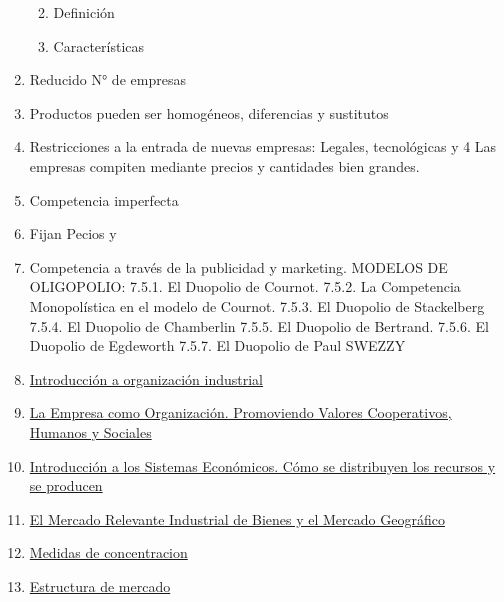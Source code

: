 \documentclass[
  a4paper,
]{article}
\providecommand{\tightlist}{%
  \setlength{\itemsep}{0pt}\setlength{\parskip}{0pt}}\usepackage{longtable,booktabs,array}
\begin{document}
\begin{enumerate}
  \begin{enumerate}
  \def\labelenumii{\Alph{enumii})}
  \tightlist
  \item
    Definición
  \item
    Características
  \end{enumerate}
\item
  Reducido N° de empresas
\item
  Productos pueden ser homogéneos, diferencias y sustitutos
\item
  Restricciones a la entrada de nuevas empresas: Legales, tecnológicas y
  4 Las empresas compiten mediante precios y cantidades bien grandes.
\item
  Competencia imperfecta
\item
  Fijan Pecios y
\item
  Competencia a través de la publicidad y marketing. MODELOS DE
  OLIGOPOLIO: 7.5.1. El Duopolio de Cournot. 7.5.2. La Competencia
  Monopolística en el modelo de Cournot. 7.5.3. El Duopolio de
  Stackelberg 7.5.4. El Duopolio de Chamberlin 7.5.5. El Duopolio de
  Bertrand. 7.5.6. El Duopolio de Egdeworth 7.5.7. El Duopolio de Paul
  SWEZZY
\item
  \href{../2023-06-12-introducion-organizacion-industrial-oi-cap1/index.qmd}{Introducción
  a organización industrial}
\item
  \href{../2023-06-13-empresa-como-organizacion-oi-cap1/index.qmd}{La
  Empresa como Organización. Promoviendo Valores Cooperativos, Humanos y
  Sociales}
\item
  \href{../2023-06-13-sistemas-economicos-oi.cap1/index.qmd}{Introducción
  a los Sistemas Económicos. Cómo se distribuyen los recursos y se
  producen}
\item
  \href{../2023-06-15-mercado-relevante-oi-cap2/index.qmd}{El Mercado
  Relevante Industrial de Bienes y el Mercado Geográfico}
\item
  \href{../2023-06-16-concentracion-poder-oi-cap3/index.qmd}{Medidas de
  concentracion}
\item
  \href{../2023-06-17-estructura-mercado-oi-cap4/index.qmd}{Estructura
  de mercado}
\end{enumerate}


\printbibliography
\end{document}
